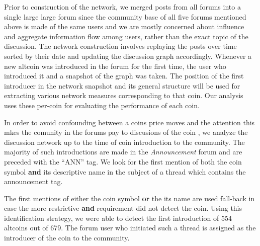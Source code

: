  






Prior to construction of the network, we merged posts from all forums into a
single large large forum since the community base of all five forums mentioned
above is made of the same users and we are mostly concerned about influence and
aggregate information flow among users, rather than the exact topic of the discussion.
The network construction involves replaying the posts over time sorted by their date and updating the
discussion graph accordingly. Whenever a new altcoin was introduced
in the forum for the first time, the user who introduced it and a snapshot of the graph was taken.
The position of the first introducer in the network snapshot and its general structure 
will be used for extracting various network measures corresponding to that coin. Our analysis
uses these per-coin for evaluating the performance of each coin.


In order to avoid confounding between a coins price moves and the attention this mkes the comunity in the forums pay to discusions of the coin , we analyze the discussion network up to the time of coin introduction to the community.
The  majority of such introductions are made in the \textit{Announcement} forum and are preceded with the ``ANN'' tag.
We look for the first mention of both the coin symbol \textbf{and} its descriptive name in the subject of a thread which contains the announcement tag. 

The first mentions of either the coin symbol \textbf{or} the its name are used fall-back in case the more restrictive \textbf{and} requirement did not detect the coin. 
Using this identification strategy, we were able to detect the first introduction of 554 altcoins out of 679.
The forum user who initiated such a thread is assigned as the  introducer of the coin to the community.
